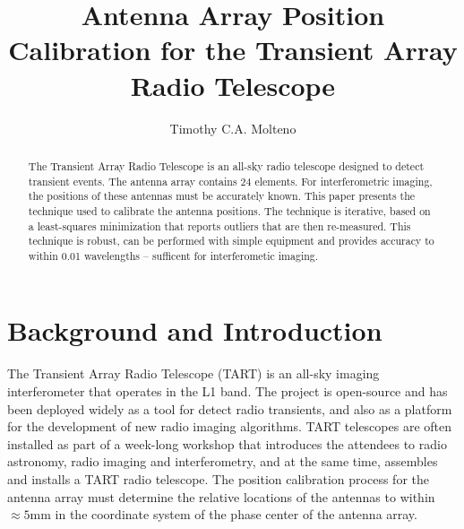 \documentclass[a4paper,10pt]{article}
\title{Antenna Array Position Calibration for the Transient Array Radio Telescope}
\author{Timothy C.A. Molteno}
\begin{document}
\maketitle

\begin{abstract}
The Transient Array Radio Telescope is an all-sky radio telescope designed to detect transient events. The antenna array contains 24 elements. For interferometric imaging, the positions of these antennas must be accurately known. This paper presents the technique used to calibrate the antenna positions. The technique is iterative, based on a least-squares minimization that reports outliers that are then re-measured. This technique is robust, can be performed with simple equipment and provides accuracy to within 0.01 wavelengths -- sufficent for interferometic imaging.
\end{abstract}

\section{Background and Introduction}

The Transient Array Radio Telescope (TART) is an all-sky imaging interferometer that operates in the L1 band. The project is open-source and has been deployed widely as a tool for detect radio transients, and also as a platform for the development of new radio imaging algorithms. TART telescopes are often installed as part of a week-long workshop that introduces the attendees to radio astronomy, radio imaging and interferometry, and at the same time, assembles and installs a TART radio telescope. The position calibration process for the antenna array must determine the relative locations of the antennas to within $\approx 5$mm in the coordinate system of the phase center of the antenna array.
\end{document}
